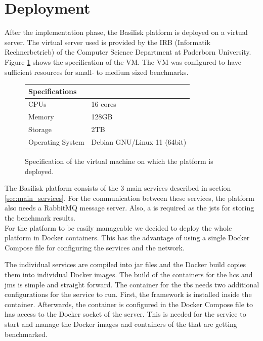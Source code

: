 \section{Deployment}
\label{sec:deployment}
After the implementation phase, the Basilisk platform is deployed on a virtual server.
The virtual server used is provided by the IRB (Informatik Rechnerbetrieb) of the Computer Science Department at Paderborn University.
Figure \ref{fig:vm_specs} shows the specification of the VM.
The VM was configured to have sufficient resources for small- to medium sized benchmarks.

\begin{figure}[tbph]
	\centering
	\begin{tabular}{ll}
		\toprule
		\textbf{Specifications} &                             \\ \midrule
		CPUs                    & 16 cores                    \\ \midrule
		Memory                  & 128GB                       \\ \midrule
		Storage                 & 2TB                         \\ \midrule
		Operating System        & Debian GNU/Linux 11 (64bit) \\ \bottomrule
	\end{tabular}
	\caption{Specification of the virtual machine on which the platform is deployed.}
	\label{fig:vm_specs}
\end{figure}

The Basilisk platform consists of the 3 main services described in section \ref{sec:main_services}.
For the communication between these services, the platform also needs a RabbitMQ message server.
Also, a \ts{} is required as the \acl{jsts} for storing the benchmark results.
\\

For the platform to be easily manageable we decided to deploy the whole platform in Docker containers.
This has the advantage of using a single Docker Compose file for configuring the services and the network.

The individual services are compiled into jar files and the Docker build copies them into individual Docker images.
The build of the containers for the \ac{hcs} and \ac{jms} is simple and straight forward.
The container for the \ac{tbs} needs two additional configurations for the service to run.
First, the \iguana{} framework is installed inside the container.
Afterwards, the container is configured in the Docker Compose file to has access to the Docker socket of the server.
This is needed for the service to start and manage the Docker images and containers of the \tsp{} that are getting benchmarked.

